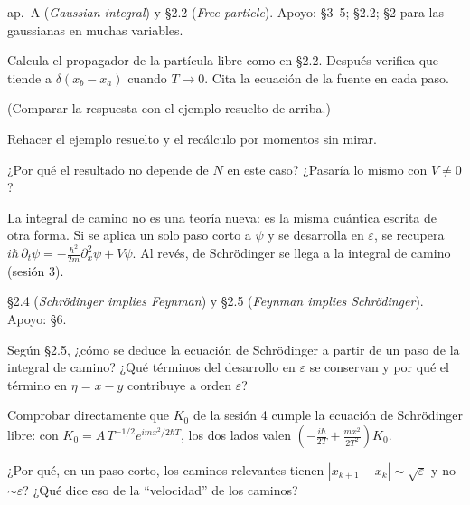  ap.~A (\textit{Gaussian integral}) y  \S2.2 (\textit{Free particle}). Apoyo:  \S3--5;  \S2.2;  \S2 para las gaussianas en muchas variables.

\begin{prompt}
Calcula el propagador de la partícula libre como en  \S2.2. Después verifica que tiende a $\delta(x_b-x_a)$ cuando $T\to0$. Cita la ecuación de la fuente en cada paso.
\end{prompt}
(Comparar la respuesta con el ejemplo resuelto de arriba.)

Rehacer el ejemplo resuelto y el recálculo por momentos sin mirar.

¿Por qué el resultado no depende de $N$ en este caso? ¿Pasaría lo mismo con $V\neq0$?


La integral de camino no es una teoría nueva: es la misma cuántica escrita de otra forma. Si se aplica un solo paso corto a $\psi$ y se desarrolla en $\varepsilon$, se recupera
$i\hbar\,\partial_t\psi=-\tfrac{\hbar^2}{2m}\partial_x^2\psi+V\psi$.
Al revés, de Schrödinger se llega a la integral de camino (sesión 3).

 \S2.4 (\textit{Schrödinger implies Feynman}) y \S2.5 (\textit{Feynman implies Schrödinger}). Apoyo:  \S6.

\begin{prompt}
Según  \S2.5, ¿cómo se deduce la ecuación de Schrödinger a partir de un paso de la integral de camino? ¿Qué términos del desarrollo en $\varepsilon$ se conservan y por qué el término en $\eta=x-y$ contribuye a orden $\varepsilon$?
\end{prompt}

Comprobar directamente que $K_0$ de la sesión 4 cumple la ecuación de Schrödinger libre: con $K_0=A\,T^{-1/2}e^{imx^2/2\hbar T}$, los dos lados valen $\left(-\frac{i\hbar}{2T}+\frac{mx^2}{2T^2}\right)K_0$.

¿Por qué, en un paso corto, los caminos relevantes tienen $|x_{k+1}-x_k|\sim\sqrt{\varepsilon}$ y no $\sim\varepsilon$? ¿Qué dice eso de la ``velocidad'' de los caminos?


